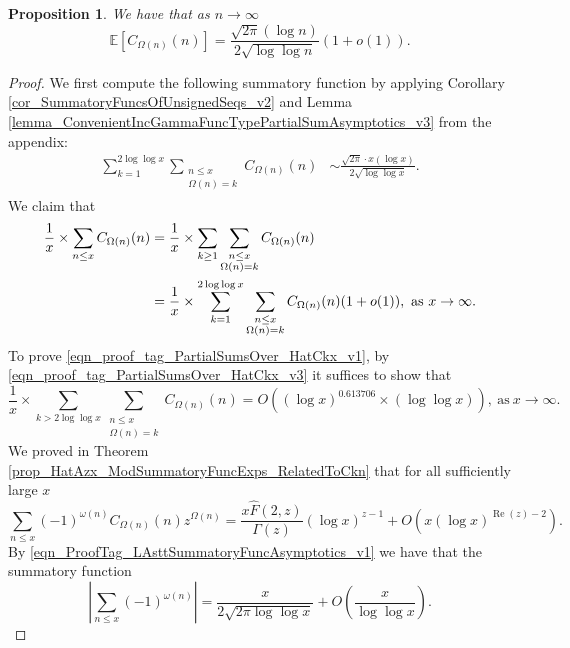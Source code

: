 \documentclass[11pt,reqno,a4letter]{article}
\numberwithin{figure}{section}
\numberwithin{table}{section}
\theoremstyle{plain}
\newtheorem{prop}[theorem]{Proposition}
\numberwithin{theorem}{section}
\theoremstyle{definition}
\renewcommand{\Re}{\operatorname{Re}}
\begin{document}
\begin{prop} 
\label{lemma_HatCAstxSum_ExactFormulaWithError_v1} 
We have that as $n \rightarrow \infty$ 
\[
\mathbb{E}\left[C_{\Omega(n)}(n)\right] = 
     \frac{\sqrt{2\pi} (\log n)}{2\sqrt{\log\log n}} (1+o(1)). 
\] 
\end{prop} 
\begin{proof} 
We first compute the following 
summatory function by applying 
Corollary \ref{cor_SummatoryFuncsOfUnsignedSeqs_v2} and 
Lemma \ref{lemma_ConvenientIncGammaFuncTypePartialSumAsymptotics_v3} from the appendix:
\begin{align} 
\label{eqn_proof_tag_PartialSumsOver_HatCkx_v3} 
\sum_{k=1}^{2\log\log x} \sum_{\substack{n \leq x \\ \Omega(n) = k}} C_{\Omega(n)}(n) & \sim 
     \frac{\sqrt{2\pi} \cdot x (\log x)}{2 \sqrt{\log\log x}}. 
\end{align} 
We claim that 
\begin{align} 
\notag 
\frac{1}{x} \times \sum_{n \leq x} C_{\Omega(n)}(n) & = \frac{1}{x} \times 
     \sum_{k \geq 1} \sum_{\substack{n \leq x \\ \Omega(n) = k}} C_{\Omega(n)}(n) \\ 
\label{eqn_proof_tag_PartialSumsOver_HatCkx_v1} 
     & = 
     \frac{1}{x} \times \sum_{k=1}^{2\log\log x} \sum_{\substack{n \leq x \\ \Omega(n) = k}} 
     C_{\Omega(n)}(n) (1+o(1)), 
     \text{ as } x \rightarrow \infty. 
\end{align} 
To prove \eqref{eqn_proof_tag_PartialSumsOver_HatCkx_v1}, by 
\eqref{eqn_proof_tag_PartialSumsOver_HatCkx_v3} it suffices to show that 
\begin{equation} 
\label{eqn_proof_tag_PartialSumsOver_HatCkx_EquivCond_v2} 
\frac{1}{x} \times 
     \sum\limits_{k > 2\log\log x} \sum\limits_{\substack{n \leq x \\ \Omega(n) = k}} C_{\Omega(n)}(n)
     = O\left((\log x)^{0.613706} \times (\log\log x)\right), 
     \mathrm{\ as\ } x \rightarrow \infty. 
\end{equation} 
We proved in Theorem \ref{prop_HatAzx_ModSummatoryFuncExps_RelatedToCkn} 
that for all sufficiently large $x$ 
\[
\sum_{n \leq x} (-1)^{\omega(n)} C_{\Omega(n)}(n) z^{\Omega(n)} = 
     \frac{x \widehat{F}(2, z)}{\Gamma(z)} (\log x)^{z-1} + O\left( 
     x (\log x)^{\Re(z)-2}\right). 
\]
By \eqref{eqn_ProofTag_LAsttSummatoryFuncAsymptotics_v1} 
we have that the summatory function 
\[
\left\lvert \sum_{n \leq x} (-1)^{\omega(n)} \right\rvert = 
     \frac{x}{2 \sqrt{2\pi \log\log x}} + O\left(\frac{x}{\log\log x}\right). 
\]
\end{proof}
\end{document}
